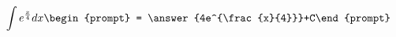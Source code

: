 \documentclass{ximera}
\author{Steven Gubkin}
\begin{document}
\begin{exercise}

\[
\int e^{\frac{x}{4}} dx \begin{prompt} = \answer{4e^{\frac{x}{4}}}+C\end{prompt}
\]

\end{exercise}
\end{document}
